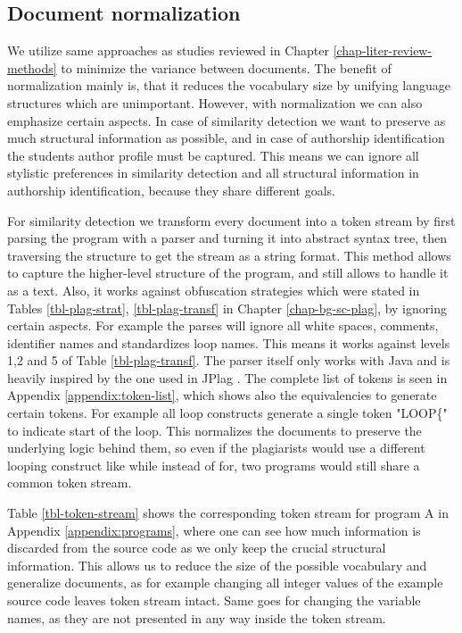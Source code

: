 \subsection{Document normalization}

We utilize same approaches as studies reviewed in Chapter \ref{chap-liter-review-methods} to minimize the variance between documents. The benefit of normalization mainly is, that it reduces the vocabulary size by unifying language structures which are unimportant. However, with normalization we can also emphasize certain aspects. In case of similarity detection we want to preserve as much structural information as possible, and in case of authorship identification the students author profile must be captured. This means we can ignore all stylistic preferences in similarity detection and all structural information in authorship identification, because they share different goals.

For similarity detection we transform every document into a token stream by first parsing the program with a parser and turning it into abstract syntax tree, then traversing the structure to get the stream as a string format. This method allows to capture the higher-level structure of the program, and still allows to handle it as a text. Also, it works against obfuscation strategies which were stated in Tables \ref{tbl-plag-strat}, \ref{tbl-plag-transf} in Chapter \ref{chap-bg-sc-plag}, by ignoring certain aspects. For example the parses will ignore all white spaces, comments, identifier names and standardizes loop names. This means it works against levels 1,2 and 5 of Table \ref{tbl-plag-transf}. The parser itself only works with Java and is heavily inspired by the one used in JPlag \cite{prechelt2002finding}. The complete list of tokens is seen in Appendix \ref{appendix:token-list}, which shows also the equivalencies to generate certain tokens. For example all loop constructs generate a single token "LOOP\{" to indicate start of the loop. This normalizes the documents to preserve the underlying logic behind them, so even if the plagiarists would use a different looping construct like while instead of for, two programs would still share a common token stream. 

Table \ref{tbl-token-stream} shows the corresponding token stream for program A in Appendix \ref{appendix:programs}, where one can see how much information is discarded from the source code as we only keep the crucial structural information. This allows us to reduce the size of the possible vocabulary and generalize documents, as for example changing all integer values of the example source code leaves token stream intact. Same goes for changing the variable names, as they are not presented in any way inside the token stream. 

